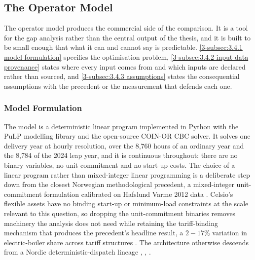 \subsection{The Operator Model}
\label{3-subsec:3.4 operator model}

The operator model produces the commercial side of the comparison. It is a tool for the gap analysis rather than the central output of the thesis, and it is built to be small enough that what it can and cannot say is predictable. \autoref{3-subsec:3.4.1 model formulation} specifies the optimisation problem, \autoref{3-subsec:3.4.2 input data provenance} states where every input comes from and which inputs are declared rather than sourced, and \autoref{3-subsec:3.4.3 assumptions} states the consequential assumptions with the precedent or the measurement that defends each one.

\subsubsection{Model Formulation}
\label{3-subsec:3.4.1 model formulation}

The model is a deterministic linear program implemented in Python with the PuLP modelling library and the open-source COIN-OR CBC solver. It solves one delivery year at hourly resolution, over the 8,760 hours of an ordinary year and the 8,784 of the 2024 leap year, and it is continuous throughout: there are no binary variables, no unit commitment and no start-up costs. The choice of a linear program rather than mixed-integer linear programming is a deliberate step down from the closest Norwegian methodological precedent, a mixed-integer unit-commitment formulation calibrated on Hafslund Varme 2012 data \cite{kirkerud_impacts_2016}. Celsio's flexible assets have no binding start-up or minimum-load constraints at the scale relevant to this question, so dropping the unit-commitment binaries removes machinery the analysis does not need while retaining the tariff-binding mechanism that produces the precedent's headline result, a $2 - 17\%$ variation in electric-boiler share across tariff structures \cite{kirkerud_impacts_2016}. The architecture otherwise descends from a Nordic deterministic-dispatch lineage \cite{kirkerud_impacts_2016}, \cite{johannsen_incentivising_2021}, \cite{tromborg_flexible_2017}.

